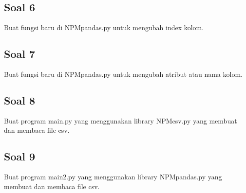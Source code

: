 

\subsection{Soal 6}
Buat fungsi baru di NPMpandas.py untuk mengubah index kolom.



\subsection{Soal 7}
Buat fungsi baru di NPMpandas.py untuk mengubah atribut atau nama kolom.



\subsection{Soal 8}
Buat program main.py yang menggunakan library NPMcsv.py yang membuat dan membaca file csv.



\subsection{Soal 9}
Buat program main2.py yang menggunakan library NPMpandas.py yang membuat dan membaca file csv.



